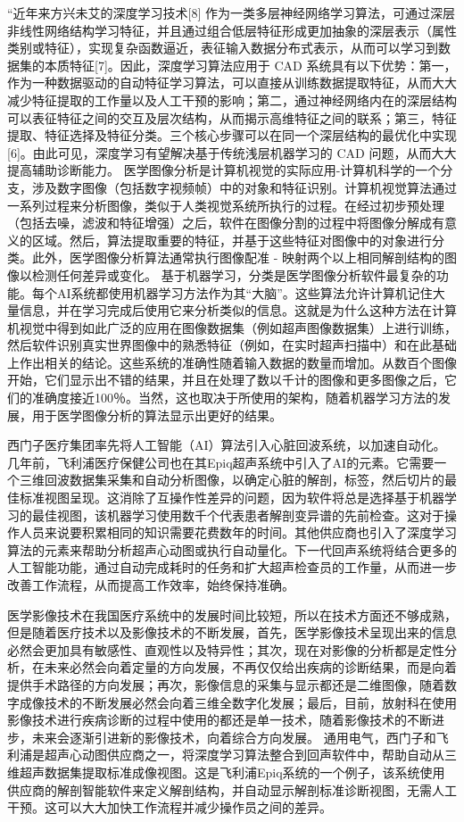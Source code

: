 “近年来方兴未艾的深度学习技术[8] 作为一类多层神经网络学习算法，可通过深层非线性网络结构学习特征，并且通过组合低层特征形成更加抽象的深层表示（属性类别或特征），实现复杂函数逼近，表征输入数据分布式表示，从而可以学习到数据集的本质特征[7]。因此，深度学习算法应用于 CAD 系统具有以下优势：第一，作为一种数据驱动的自动特征学习算法，可以直接从训练数据提取特征，从而大大减少特征提取的工作量以及人工干预的影响；第二，通过神经网络内在的深层结构可以表征特征之间的交互及层次结构，从而揭示高维特征之间的联系；第三，特征提取、特征选择及特征分类。三个核心步骤可以在同一个深层结构的最优化中实现[6]。由此可见，深度学习有望解决基于传统浅层机器学习的 CAD 问题，从而大大提高辅助诊断能力。
医学图像分析是计算机视觉的实际应用-计算机科学的一个分支，涉及数字图像（包括数字视频帧）中的对象和特征识别。计算机视觉算法通过一系列过程来分析图像，类似于人类视觉系统所执行的过程。在经过初步预处理（包括去噪，滤波和特征增强）之后，软件在图像分割的过程中将图像分解成有意义的区域。然后，算法提取重要的特征，并基于这些特征对图像中的对象进行分类。此外，医学图像分析算法通常执行图像配准 - 映射两个以上相同解剖结构的图像以检测任何差异或变化。
基于机器学习，分类是医学图像分析软件最复杂的功能。每个AI系统都使用机器学习方法作为其“大脑”。这些算法允许计算机记住大量信息，并在学习完成后使用它来分析类似的信息。这就是为什么这种方法在计算机视觉中得到如此广泛的应用在图像数据集（例如超声图像数据集）上进行训练，然后软件识别真实世界图像中的熟悉特征（例如，在实时超声扫描中）和在此基础上作出相关的结论。这些系统的准确性随着输入数据的数量而增加。从数百个图像开始，它们显示出不错的结果，并且在处理了数以千计的图像和更多图像之后，它们的准确度接近100％。当然，这也取决于所使用的架构，随着机器学习方法的发展，用于医学图像分析的算法显示出更好的结果。

西门子医疗集团率先将人工智能（AI）算法引入心脏回波系统，以加速自动化。几年前，飞利浦医疗保健公司也在其Epiq超声系统中引入了AI的元素。它需要一个三维回波数据集采集和自动分析图像，以确定心脏的解剖，标签，然后切片的最佳标准视图呈现。这消除了互操作性差异的问题，因为软件将总是选择基于机器学习的最佳视图，该机器学习使用数千个代表患者解剖变异谱的先前检查。这对于操作人员来说要积累相同的知识需要花费数年的时间。其他供应商也引入了深度学习算法的元素来帮助分析超声心动图或执行自动量化。下一代回声系统将结合更多的人工智能功能，通过自动完成耗时的任务和扩大超声检查员的工作量，从而进一步改善工作流程，从而提高工作效率，始终保持准确。

医学影像技术在我国医疗系统中的发展时间比较短，所以在技术方面还不够成熟，但是随着医疗技术以及影像技术的不断发展，首先，医学影像技术呈现出来的信息必然会更加具有敏感性、直观性以及特异性；其次，现在对影像的分析都是定性分析，在未来必然会向着定量的方向发展，不再仅仅给出疾病的诊断结果，而是向着提供手术路径的方向发展；再次，影像信息的采集与显示都还是二维图像，随着数字成像技术的不断发展必然会向着三维全数字化发展；最后，目前，放射科在使用影像技术进行疾病诊断的过程中使用的都还是单一技术，随着影像技术的不断进步，未来会逐渐引进新的影像技术，向着综合方向发展。 通用电气，西门子和飞利浦是超声心动图供应商之一，将深度学习算法整合到回声软件中，帮助自动从三维超声数据集提取标准成像视图。这是飞利浦Epiq系统的一个例子，该系统使用供应商的解剖智能软件来定义解剖结构，并自动显示解剖标准诊断视图，无需人工干预。这可以大大加快工作流程并减少操作员之间的差异。

